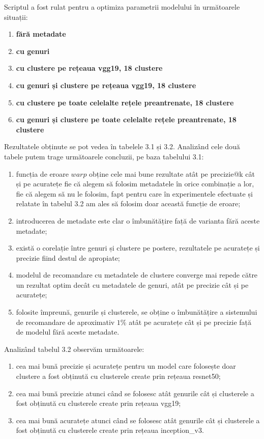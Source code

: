 Scriptul a fost rulat pentru a optimiza parametrii modelului în următoarele situații:
\begin{enumerate}
	\item \textbf{fără metadate}
	\item \textbf{cu genuri}
	\item \textbf{cu clustere pe rețeaua vgg19, 18 clustere}
	\item \textbf{cu genuri și clustere pe rețeaua vgg19, 18 clustere}
	\item \textbf{cu clustere pe toate celelalte rețele preantrenate, 18 clustere}
	\item \textbf{cu genuri și clustere pe toate celelalte rețele preantrenate, 18 clustere}
\end{enumerate}
Rezultatele obținute se pot vedea în tabelele 3.1 și 3.2. Analizând cele două tabele putem trage următoarele concluzii, pe baza tabelului 3.1:
\begin{enumerate}
	\item funcția de eroare $warp$ obține cele mai bune rezultate atât pe precizie@k cât și pe acuratețe fie că alegem să folosim metadatele în orice combinație a lor, fie că alegem să nu le folosim, fapt pentru care în experimentele efectuate și relatate în tabelul 3.2 am ales să folosim doar această funcție de eroare;
	\item introducerea de metadate este clar o îmbunătățire față de varianta fără aceste metadate;
	\item există o corelație între genuri și clustere pe postere, rezultatele pe acuratețe și precizie fiind destul de apropiate;
	\item modelul de recomandare cu metadatele de clustere converge mai repede către un rezultat optim decât cu metadatele de genuri, atât pe precizie cât și pe acuratețe;
	\item folosite împreună, genurile și clusterele, se obține o îmbunătățire a sistemului de recomandare de aproximativ $1\%$ atât pe acuratețe cât și pe precizie față de modelul fără aceste metadate.
\end{enumerate}

Analizând tabelul 3.2 observăm următoarele:
\begin{enumerate}
	\item cea mai bună precizie și acuratețe pentru un model care folosește doar clustere a fost obținută cu clusterele create prin rețeaua resnet50;
	\item cea mai bună precizie atunci când se folosesc atât genurile cât și clusterele a fost obținută cu clusterele create prin rețeaua vgg19;
	\item cea mai bună acuratețe atunci când se folosesc atât genurile cât și clusterele a fost obținută cu clusterele create prin rețeaua inception\_v3.
\end{enumerate}

